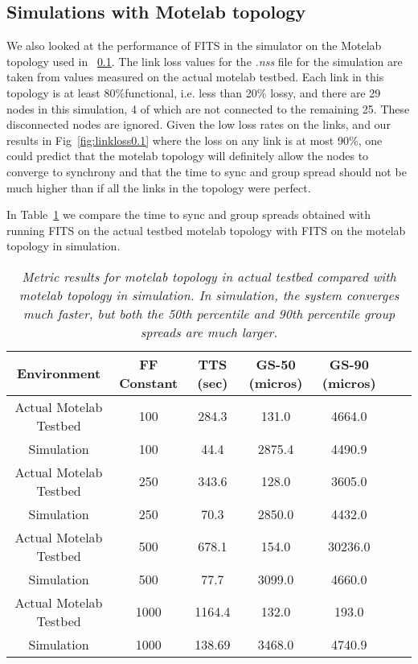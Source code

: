 \subsection{Simulations with Motelab topology}

We also looked at the performance of FITS in the simulator on the Motelab topology used in ~\ref{}.
The link loss values for the \emph{.nss} file for the simulation are taken from values measured on the actual
motelab testbed. 
Each link in this topology is at least 80\%functional, i.e. less than 20\% lossy, and there
are 29 nodes in this simulation, 4 of which are not connected to the remaining 25. 
These disconnected nodes are ignored. Given the low loss rates on the links, and our results in 
Fig~\ref{fig:linkloss0.1} where the loss on any link is at most 90\%, one could predict that
the motelab topology will definitely allow the nodes to converge to synchrony and that the time
to sync and group spread should not be much higher than if all the links in the topology were perfect.

In Table~\ref{table:motelab}
we compare the time to sync and group spreads obtained with running FITS on the actual testbed motelab
topology with FITS on the motelab topology in simulation.  

\begin{table}[t]
\begin{center}
\begin{tabular}{|c|c|c|c|c|c|c|} \hline
Environment            &  FF Constant   & TTS (sec) & GS-50 (micros) & GS-90 (micros) \\ \hline \hline
Actual Motelab Testbed &  100           & 284.3     & 131.0          & 4664.0  \\
Simulation             &  100           &  44.4     & 2875.4         & 4490.9  \\ \hline \hline
Actual Motelab Testbed &  250           & 343.6     & 128.0          & 3605.0  \\
Simulation             &  250           &  70.3     & 2850.0         & 4432.0  \\ \hline \hline
Actual Motelab Testbed &  500           & 678.1     & 154.0          & 30236.0  \\
Simulation             &  500           &  77.7     & 3099.0         & 4660.0  \\ \hline \hline
Actual Motelab Testbed &  1000          &  1164.4   & 132.0          & 193.0  \\
Simulation             &  1000          &  138.69   & 3468.0         & 4740.9  \\ \hline \hline
\end{tabular}
\end{center}
\caption{{\it Metric results for motelab topology in actual testbed compared with motelab topology in simulation. In simulation, the system converges much faster, but both the 50th percentile and 90th percentile group spreads are much larger.}}
\label{table:motelab}
\end{table}

